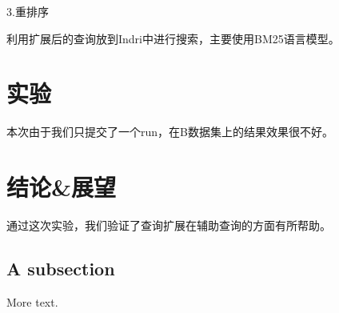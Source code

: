 \documentclass[11pt]{article} %
\begin{document}
\begin{CJK}{UTF8}{gkai}
3.重排序

利用扩展后的查询放到Indri中进行搜索，主要使用BM25语言模型。


\section{实验}

本次由于我们只提交了一个run，在B数据集上的结果效果很不好。

\section{结论&展望}

通过这次实验，我们验证了查询扩展在辅助查询的方面有所帮助。










































\subsection{A subsection}

More text.





\end{CJK}
\end{document}
